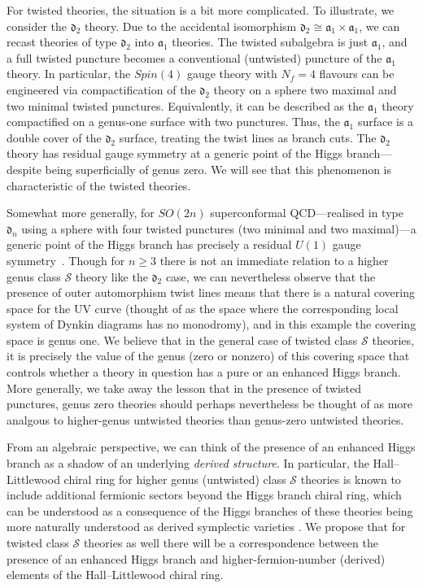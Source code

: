 \documentclass[a4paper]{article}
\def\af{\mathfrak{a}}
\def\df{\mathfrak{d}}
\begin{document}
For twisted theories, the situation is a bit more complicated. To illustrate, we consider the $\mathfrak{d_2}$ theory. Due to the accidental isomorphism $\df_2\cong\af_1\times \af_1$, we can recast theories of type $\df_2$ into $\af_1$ theories. The twisted subalgebra is just $\af_1$, and a full twisted puncture becomes a conventional (untwisted) puncture of the $\af_1$ theory. In particular, the $Spin(4)$ gauge theory with $N_f=4$ flavours can be engineered via compactification of the $\df_2$ theory on a sphere two maximal and two minimal twisted punctures. Equivalently, it can be described as the $\af_1$ theory compactified on a genus-one surface with two punctures. Thus, the $\af_1$ surface is a double cover of the $\df_2$ surface, treating the twist lines as branch cuts. The $\df_2$ theory has residual gauge symmetry at a generic point of the Higgs branch---despite being superficially of genus zero. We will see that this phenomenon is characteristic of the twisted theories.

Somewhat more generally, for $SO(2n)$ superconformal QCD---realised in type $\df_n$ using a sphere with four twisted punctures (two minimal and two maximal)---a generic point of the Higgs branch has precisely a residual $U(1)$ gauge symmetry~\cite{Argyres:1996hc}. Though for $n\geqslant 3$ there is not an immediate relation to a higher genus class $\mathcal{S}$ theory like the $\df_2$ case, we can nevertheless observe that the presence of outer automorphism twist lines means that there is a natural covering space for the UV curve (thought of as the space where the corresponding local system of Dynkin diagrams has no monodromy), and in this example the covering space is genus one. We believe that in the general case of twisted class $\mathcal{S}$ theories, it is precisely the value of the genus (zero or nonzero) of this covering space that controls whether a theory in question has a pure or an enhanced Higgs branch. More generally, we take away the lesson that in the presence of twisted punctures, genus zero theories should perhaps nevertheless be thought of as more analgous to higher-genus untwisted theories than genus-zero untwisted theories.

From an algebraic perspective, we can think of the presence of an enhanced Higgs branch as a shadow of an underlying \emph{derived structure}. In particular, the Hall--Littlewood chiral ring for higher genus (untwisted) class $\mathcal{S}$ theories is known to include additional fermionic sectors beyond the Higgs branch chiral ring, which can be understood as a consequence of the Higgs branches of these theories being more naturally understood as derived symplectic varieties \cite{CJBDBS:HL}. We propose that for twisted class $\mathcal{S}$ theories as well there will be a correspondence between the presence of an enhanced Higgs branch and higher-fermion-number (derived) elements of the Hall--Littlewood chiral ring.
\end{document}
